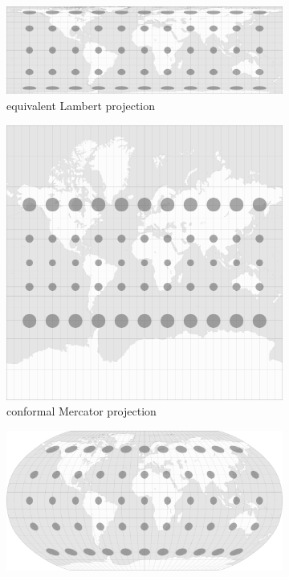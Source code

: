 \begin{figure}[ht]
  \vspace{1.5em}
  \centering
  \begin{subfigure}{0.59\textwidth}
    \centering
    \includegraphics[width=0.9\linewidth]{graphics/basics/hgis/projection_distortion_lambert.png}
    \caption{equivalent Lambert projection \protect\footnotemark}
  \end{subfigure}
  \begin{subfigure}{0.39\textwidth}
    \centering
    \includegraphics[width=0.9\linewidth]{graphics/basics/hgis/projection_distortion_mercator.png}
    \caption{conformal Mercator projection \protect\footnotemark}
    \vspace{1em}
  \end{subfigure}
  \begin{subfigure}{0.55\textwidth}
    \centering
    \includegraphics[width=0.9\linewidth]{graphics/basics/hgis/projection_distortion_robinson.png}

\end{subfigure}
\end{figure}
